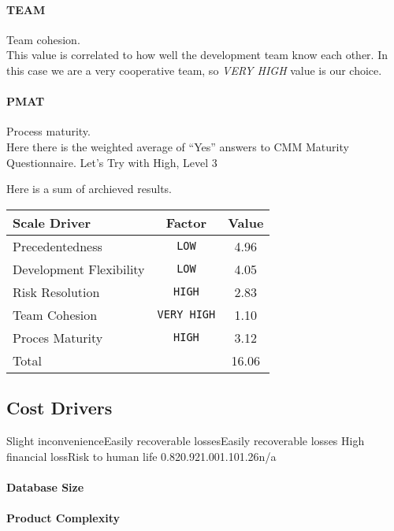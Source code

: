 \paragraph{TEAM} Team cohesion. \\
This value is correlated to how well the development team know each other. 
In this case we are a very cooperative team, so \emph{VERY HIGH} value is
our choice.

\paragraph{PMAT} Process maturity. \\
Here there is the weighted average of ``Yes'' answers to CMM Maturity Questionnaire.
Let's Try with High, Level 3

Here is a sum of archieved results.

\begin{tabular}{ p{5cm} | c | c }
    Scale Driver            & Factor             &  Value   \\ \hline
    Precedentedness         & \texttt{LOW}       &  4.96    \\
    Development Flexibility & \texttt{LOW}       &  4.05    \\
    Risk Resolution         & \texttt{HIGH}      &  2.83    \\
    Team Cohesion           & \texttt{VERY HIGH} &  1.10    \\
    Proces Maturity         & \texttt{HIGH}      &  3.12    \\ \hline
    Total                   &                    & 16.06  
\end{tabular}

\subsection{Cost Drivers} %
\label{sub:cost_drivers}

{Slight inconvenience}{Easily recoverable losses}{Easily recoverable losses}
{High financial loss}{Risk to human life}{}
{0.82}{0.92}{1.00}{1.10}{1.26}{n/a}
\paragraph{Database Size}
\paragraph{Product Complexity}
